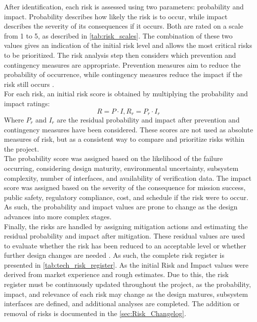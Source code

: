 After identification, each risk is assessed using two parameters: probability and impact. Probability describes how likely the risk is to occur, while impact describes the severity of its consequences if it occurs. Both are rated on a scale from 1 to 5, as described in \autoref{tab:risk_scales}. The combination of these two values gives an indication of the initial risk level and allows the most critical risks to be prioritized. The risk analysis step then considers which prevention and contingency measures are appropriate. Prevention measures aim to reduce the probability of occurrence, while contingency measures reduce the impact if the risk still occurs \cite{Hamann2006SystemsI}.\\
For each risk, an initial risk score is obtained by multiplying the probability and impact ratings:
\begin{equation}
    R = P \cdot I , 
    R_r = P_r \cdot I_r
\end{equation}
Where $P_r$ and $I_r$ are the residual probability and impact after prevention and contingency measures have been considered. These scores are not used as absolute measures of risk, but as a consistent way to compare and prioritize risks within the project.\\

The probability score was assigned based on the likelihood of the failure  occurring, considering design maturity, environmental uncertainty, subsystem complexity, number of interfaces, and availability of verification data. The impact score was assigned based on the severity of the consequence for mission success, public safety, regulatory compliance, cost, and schedule if the risk were to occur. As such, the probability and impact values are prone to change as the design advances into more complex stages.\\

Finally, the risks are handled by assigning mitigation actions and estimating the residual probability and impact after mitigation. These residual values are used to evaluate whether the risk has been reduced to an acceptable level or whether further design changes are needed \cite{Hamann2006SystemsI}. As such, the complete risk register is presented in \autoref{tab:tech_risk_register}. As the initial Risk and Impact values were derived from market experience and rough estimates. Due to this, the risk register must be continuously updated throughout the project, as the probability, impact, and relevance of each risk may change as the design matures, subsystem interfaces are defined, and additional analyses are completed. The addition or removal of risks is documented in the \autoref{sec:Risk_Changelog}. 

